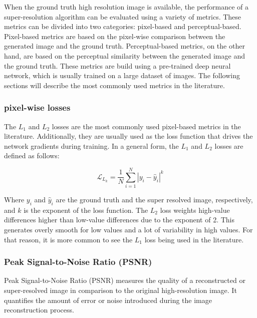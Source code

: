     When the ground truth high resolution image is available, the performance of a super-resolution algorithm can be evaluated using a variety of metrics. 
    These metrics can be divided into two categories: pixel-based and perceptual-based.
    Pixel-based metrics are based on the pixel-wise comparison between the generated image and the ground truth. 
    Perceptual-based metrics, on the other hand, are based on the perceptual similarity between the generated image and the ground truth. 
    These metrics are build using a pre-trained deep neural network, which is usually trained on a large dataset of images.
    The following sections will describe the most commonly used metrics in the literature.

        \subsubsection{pixel-wise losses}

            The $L_1$ and $L_2$ losses are the most commonly used pixel-based metrics in the literature. 
            Additionally, they are usually used as the loss function that drives the network gradients during training.
            In a general form, the $L_1$ and $L_2$ losses are defined as follows:

            \begin{equation}
                \mathcal{L}_{L_k} = \frac{1}{N} \sum_{i=1}^{N} |y_i - \hat{y}_i|^k
            \end{equation}

            Where $y_i$ and $\hat{y}_i$ are the ground truth and the super resolved image, respectively, and $k$ is the exponent of the loss function. 
            The $L_2$ loss weights high-value differences higher than low-value differences due to the exponent of 2. 
            This generates overly smooth for low values and a lot of variability in high values. 
            For that reason, it is more common to see the $L_1$ loss being used in the literature.

        \subsubsection{Peak Signal-to-Noise Ratio (PSNR)}

         
            Peak Signal-to-Noise Ratio (PSNR) measures the quality of a reconstructed or super-resolved image in comparison to the original high-resolution image. It quantifies the amount of error or noise introduced during the image reconstruction process.
            
